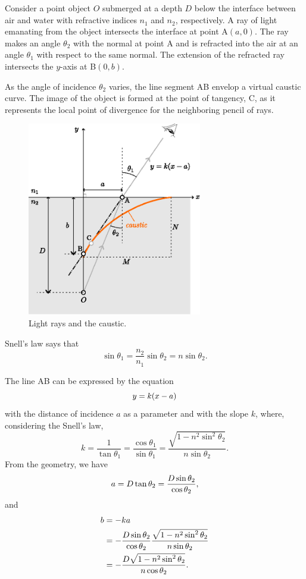\documentclass[twocolumn]{article}
\begin{document}
Consider a point object $O$ submerged at a depth $D$ below the interface between air and water with refractive indices $n_1^{}$ and $n_2^{}$, respectively. A ray of light emanating from the object intersects the interface at point A$(a, 0)$. The ray makes an angle $\theta_2$ with the normal at point A and is refracted into the air at an angle $\theta_1$ with respect to the same normal. The extension of the refracted ray intersects the $y$-axis at B$(0, b)$.

As the angle of incidence $\theta_2$ varies, the line segment AB envelop a virtual caustic curve. The image of the object is formed at the point of tangency, C, as it represents the local point of divergence for the neighboring pencil of rays.

\begin{figure}
	\centering
	\includegraphics[width=3in]{figs/g237.eps}
	\caption{Light rays and the caustic.}
	\label{fig:geometry}
\end{figure}

Snell's law says that
$$ \sin\theta_1 = \frac{n_2^{}}{n_1^{}} \sin\theta_2 = n\sin\theta_2.$$

The line AB can be expressed by the equation
$$y=k(x-{a})$$
with the distance of incidence $a$ as a parameter and with the slope $k$,
where, considering the Snell's law,
$$k=\dfrac{1}{\tan\theta_1}=\dfrac{\cos\theta_1}{\sin\theta_1}
=\dfrac{\sqrt{1-n^2\sin^2\theta_2}}{n\sin\theta_2}.$$
From the geometry, we have
$$	{a} = D\tan\theta_2 = \dfrac{D\sin\theta_2}{\cos\theta_2},$$
and
$$\begin{aligned}
	{b} &= -k{a} \\
	&= -\dfrac{D\sin\theta_2}{\cos\theta_2}
	\dfrac{\sqrt{1-n^2\sin^2\theta_2}}{n\sin\theta_2}\\
	&=-\dfrac{D\sqrt{1-n^2\sin^2\theta_2}}{n\cos\theta_2}.
\end{aligned}$$
\end{document}
